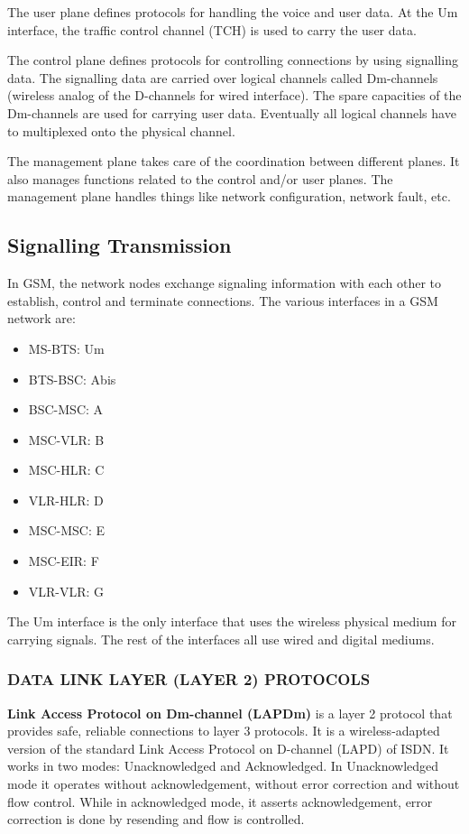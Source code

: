 The user plane defines protocols for handling the voice and user data. 
At the Um interface, the traffic control channel (TCH) is used to carry the 
user data.

The control plane defines protocols for controlling connections by using 
signalling data.
The signalling data are carried over logical channels called Dm-channels 
(wireless analog of the D-channels for wired interface).
The spare capacities of the Dm-channels are used for carrying user data.
Eventually all logical channels have to multiplexed onto the physical channel.

The management plane takes care of the coordination between different planes.
It also manages functions related to the control and/or user planes.
The management plane handles things like network configuration, network fault,
etc.


\subsection{Signalling Transmission}
In GSM, the network nodes exchange signaling information with each other to
establish, control and terminate connections.
The various interfaces in a GSM network are:
\begin{itemize}[noitemsep,topsep=0pt,parsep=0pt,partopsep=0pt]
 \item MS-BTS: Um
 \item BTS-BSC: Abis
 \item BSC-MSC: A
 \item MSC-VLR: B
 \item MSC-HLR: C
 \item VLR-HLR: D
 \item MSC-MSC: E
 \item MSC-EIR: F
 \item VLR-VLR: G
\end{itemize}

The Um interface is the only interface that uses the wireless physical medium 
for carrying signals. The rest of the interfaces all use wired and digital 
mediums.

\subsubsection{\uppercase{Data Link Layer (Layer 2) protocols}}

\textbf{Link Access Protocol on Dm-channel (LAPDm)} is a layer 2 protocol that
provides safe, reliable connections to layer 3 protocols. It is a 
wireless-adapted version of 
 the standard Link Access Protocol on D-channel (LAPD) of ISDN. It works in 
 two modes: Unacknowledged and Acknowledged. In Unacknowledged mode it 
 operates without acknowledgement,
 without error correction and without flow control. While in acknowledged 
 mode, it asserts acknowledgement, error correction is done by resending and 
 flow is controlled.
 
